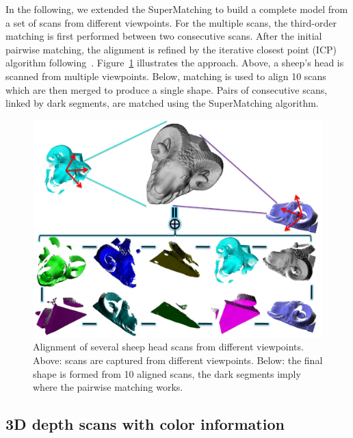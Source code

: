 In the following, we extended the SuperMatching to build a complete model from a set of scans from different viewpoints.
For the multiple scans, the third-order matching is first performed between two consecutive scans.
After the initial pairwise matching, the alignment is refined by the iterative closest point (ICP) algorithm following~\cite{Gelfand05}.
Figure~\ref{fig:3DRigid} illustrates the approach.
Above, a sheep's head is scanned from multiple viewpoints. Below, matching is used to align 10 scans which are then merged to produce a single shape.
Pairs of consecutive scans, linked by dark segments, are matched using the SuperMatching algorithm.

\begin{figure}[h]
\centering
  \includegraphics[width=0.99\linewidth]{figures/3DRigid.pdf}
  \caption{Alignment of several sheep head scans from different viewpoints. 
  Above: scans are captured from different viewpoints. Below: the final shape is formed from 10 aligned scans, the dark segments imply where the pairwise matching works.}
\label{fig:3DRigid}
\end{figure}


\subsection{3D depth scans with color information}
\label{subsec:3dColored}

